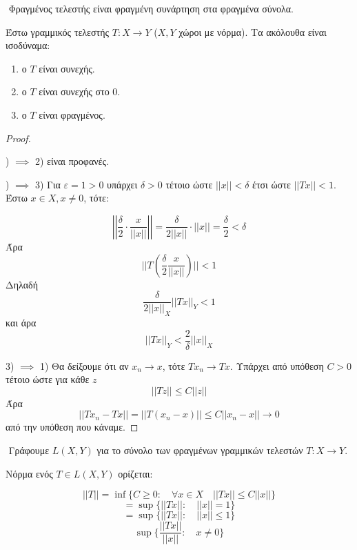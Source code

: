 $ $\newline
Φραγμένος τελεστής είναι φραγμένη συνάρτηση στα φραγμένα σύνολα.

\begin{protash}
    Έστω γραμμικός τελεστής $T: X \rightarrow Y$ ($X,Y$ χώροι με νόρμα). Τα ακόλουθα είναι ισοδύναμα:
    \begin{enumerate}
    \item ο $T$ είναι συνεχής.
    \item ο $T$ είναι συνεχής στο $0$.
    \item ο $T$ είναι φραγμένος.
    \end{enumerate}
\end{protash}

\begin{proof} $ $

    $ $) $\implies$ 2) είναι προφανές.

    $ $) $\implies$ 3) Για $\varepsilon = 1 >0$ υπάρχει $\delta >0$ τέτοιο ώστε $||x||< \delta$ έτσι ώστε $||Tx|| <1$. Έστω $x \in X, x\neq 0$, τότε:

    $$\left|\left| \frac{\delta}{2} \cdot \frac{x}{||x||} \right|\right| = \frac{\delta}{2||x||} \cdot ||x|| = \frac{\delta}{2} < \delta$$ Άρα 
    $$|| T(\frac{\delta}{2} \frac{x}{||x||})|| <1$$ Δηλαδή $$\frac{\delta}{2 ||x||_X} ||Tx||_Y <1$$ και άρα 
    $$||Tx||_Y < \frac{2}{\delta} ||x||_X$$

    
    3) $\implies$ 1) Θα δείξουμε ότι αν $x_n \rightarrow x$, τότε $Tx_n \rightarrow Tx$. Υπάρχει από υπόθεση $C>0$ τέτοιο ώστε για κάθε $z$
    $$|| Tz || \leq C ||z||$$ Άρα 
    $$||Tx_n - Tx|| = ||T(x_n - x)|| \leq C ||x_n - x|| \rightarrow 0$$ από την υπόθεση που κάναμε.

\end{proof}

$ $\newline
Γράφουμε $L(X,Y)$ για το σύνολο των φραγμένων γραμμικών τελεστών $T: X \rightarrow Y$.

\begin{definition}
    Νόρμα ενός $T \in L(X,Y)$ ορίζεται: 

    $$||T|| = \inf \{ C \geq 0: \quad \forall x \in X \quad ||Tx|| \leq C ||x||\}$$
    $$=\sup \{ ||Tx||: \quad ||x||=1\}$$
    $$=\sup \{||Tx||: \quad ||x||\leq 1\}$$
    $$\sup \{ \frac{||Tx||}{||x||}: \quad x\neq 0\}$$
\end{definition}

